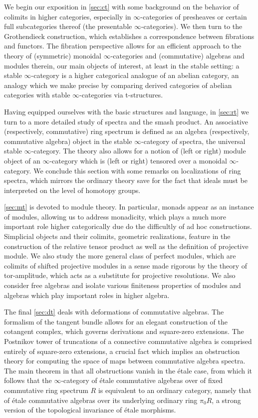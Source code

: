 \documentclass{article}
\theoremstyle{definition}
\renewcommand{\i}{\infty}
\begin{document}
We begin our exposition in \autoref{sec:ct} with some background on the behavior of colimits in higher categories, especially in $\i$-categories of presheaves or certain full subcategories thereof (the presentable $\i$-categories).
We then turn to the Grothendieck construction, which establishes a correspondence between fibrations and functors. The fibration perspective allows for an efficient approach to the theory of (symmetric) monoidal $\i$-categories and (commutative) algebras and modules therein, our main objects of interest, at least in the stable setting: a stable $\i$-category is a higher categorical analogue of an abelian category, an analogy which we make precise by comparing derived categories of abelian categories with stable $\i$-categories via t-structures.

Having equipped ourselves with the basic structures and language, in \autoref{sec:rt} we turn to a more detailed study of spectra and the smash product.
An associative (respectively, commutative) ring spectrum is defined as an algebra (respectively, commutative algebra) object in the stable $\i$-category of spectra, the universal stable $\i$-category.
The theory also allows for a notion of (left or right) module object of an $\i$-category which is (left or right) tensored over a monoidal $\i$-category.
We conclude this section with some remarks on localizations of ring spectra, which mirrors the ordinary theory save for the fact that ideals must be interpreted on the level of homotopy groups. 


\autoref{sec:mt} is devoted to module theory.
In particular, monads appear as an instance of modules, allowing us to address monadicity, which plays a much more important role higher categorically due do the difficultly of ad hoc constructions.
Simplicial objects and their colimits, geometric realizations, feature in the construction of the relative tensor product as well as the definition of projective module.
We also study the more general class of perfect modules, which are colimits of shifted projective modules in a sense made rigorous by the theory of tor-amplitude, which acts as a substitute for projective resolutions.
We also consider free algebras and isolate various finiteness properties of modules and algebras which play important roles in higher algebra.

The final \autoref{sec:dt} deals with deformations of commutative algebras.
The formalism of the tangent bundle allows for an elegant construction of the cotangent complex, which governs derivations and square-zero extensions.
The Postnikov tower of truncations of a connective commutative algebra is comprised entirely of square-zero extensions, a crucial fact which implies an obstruction theory for computing the space of maps between commutative algebra spectra.
The main theorem in that all obstructions vanish in the \'etale case, from which it follows that the $\i$-category of \'etale commutative algebras over of fixed commutative ring spectrum $R$ is equivalent to an ordinary category, namely that of \'etale commutative algebras over its underlying ordinary ring $\pi_0 R$, a strong version of the topological invariance of \'etale morphisms.
\end{document}
